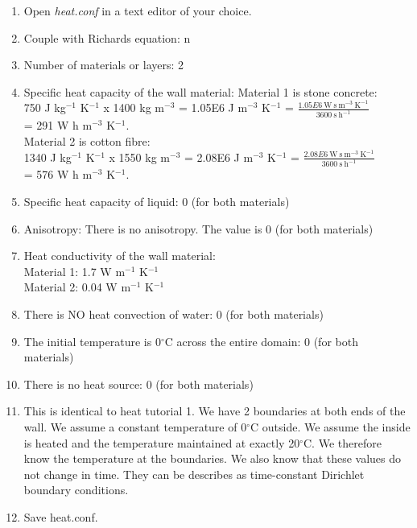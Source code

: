 \documentclass[
10pt, %
a4paper, %
oneside, %
headinclude,footinclude, %
BCOR5mm, %
]{scrartcl}
\begin{document}
\begin{enumerate}
\item Open \emph{heat.conf} in a text editor of your choice. 
\item Couple with Richards equation: n
\item Number of materials or layers: 2
\item Specific heat capacity of the wall material: 
Material 1 is stone concrete: \\750 J kg$^{-1}$ K$^{-1}$ x 1400 kg m$^{-3}$ = 1.05E6 J m$^{-3}$ K$^{-1}$ = $\frac{1.05E6~\mathrm{W~s~m^{-3}~K^{-1}}}{3600~\mathrm{s~h^{-1}}}$ \\= 291 W h m$^{-3}$ K$^{-1}$. \\
Material 2 is cotton fibre: \\1340 J kg$^{-1}$ K$^{-1}$ x 1550 kg m$^{-3}$ = 2.08E6 J m$^{-3}$ K$^{-1}$ = $\frac{2.08E6~\mathrm{W~s~m^{-3}~K^{-1}}}{3600~\mathrm{s~h^{-1}}}$ \\= 576 W h m$^{-3}$ K$^{-1}$. 
\item Specific heat capacity of liquid: 0 (for both materials)
\item Anisotropy: There is no anisotropy. The value is 0 (for both materials)
\item Heat conductivity of the wall material: \\ Material 1: 1.7 W m$^{-1}$ K$^{-1}$ \\ Material 2: 0.04 W m$^{-1}$ K$^{-1}$
\item There is NO heat convection of water: 0 (for both materials)
\item The initial temperature is 0$^{\circ}$C across the entire domain: 0 (for both materials)
\item There is no heat source: 0 (for both materials)
\item This is identical to heat tutorial 1. We have 2 boundaries at both ends of the wall. We assume a constant temperature of 0$^{\circ}$C outside. We assume the inside is heated and the temperature maintained at exactly 20$^{\circ}$C. We therefore know the temperature at the boundaries. We also know that these values do not change in time. They can be describes as time-constant Dirichlet boundary conditions. \\

\item Save heat.conf.
\end{enumerate}
\end{document}
